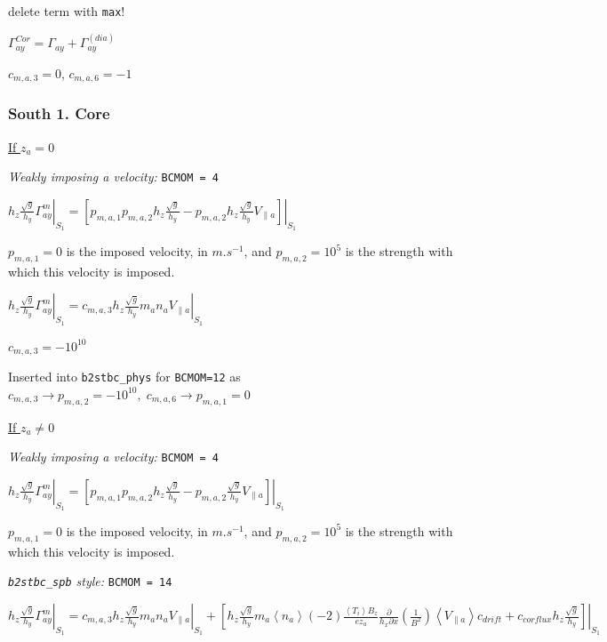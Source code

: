\documentclass[a4paper,10pt]{report}
\begin{document}
delete term with {\tt max}!

$\Gamma_{ay}^{Cor} = \Gamma_{ay} + \Gamma_{ay}^{(dia)}$

$c_{m,a,3} = 0$,  $c_{m,a,6} = -1$

\subsubsection{South 1. Core}

\underline{If $z_a = 0$}

{\em Weakly imposing a velocity:} {\tt BCMOM = 4}

$ \left. h_z \frac{\sqrt g}{h_y} \Gamma_{ay}^m \right|_{S_1} = \left. \left[
	p_{m,a,1} p_{m,a,2} h_z \frac{\sqrt g}{h_y} -
	p_{m,a,2} h_z \frac{\sqrt g}{h_y} V_{\parallel a}
\right] \right|_{S_1}$

$p_{m,a,1}=0$ is the imposed velocity, in $m.s^{-1}$, and $p_{m,a,2}=10^5$ is the strength with which this velocity is imposed.

$ \left. h_z \frac{\sqrt g}{h_y} \Gamma_{ay}^m \right|_{S_1} = c_{m,a,3} h_z \left. \frac{\sqrt g}{h_y} m_a n_a V_{\parallel a} \right|_{S_1}$

$c_{m,a,3} = -10^{10}$

Inserted into {\tt b2stbc\_phys} for {\tt BCMOM=12} as $c_{m,a,3} \rightarrow p_{m,a,2} = -10^{10},\;c_{m,a,6} \rightarrow
p_{m,a,1} = 0$

\underline{If $z_a \neq 0$}


{\em Weakly imposing a velocity:} {\tt BCMOM = 4}

$ \left. h_z \frac{\sqrt g}{h_y} \Gamma_{ay}^m \right|_{S_1} = \left. \left[
	p_{m,a,1} p_{m,a,2} h_z \frac{\sqrt g}{h_y} -
	p_{m,a,2} \frac{\sqrt g}{h_y} V_{\parallel a}
\right] \right|_{S_1}$

$p_{m,a,1}=0$ is the imposed velocity, in $m.s^{-1}$, and $p_{m,a,2}=10^5$ is the strength with which this velocity is imposed.

{\em {\tt b2stbc\_spb} style:} {\tt BCMOM = 14}

$\left. h_z \frac{\sqrt g}{h_y} \Gamma_{ay}^m \right|_{S_1} =
c_{m,a,3} h_z \left. \frac{\sqrt g}{h_y} m_a n_a V_{\parallel a} \right|_{S_1} + \left. \left[
h_z \frac{\sqrt g}{h_y} m_a \left\langle n_a \right\rangle \left( -2 \right)\frac{\left\langle T_i \right\rangle B_z}{ez_a}\frac{\partial }{h_x \partial x} \left( \frac 1{B^2} \right) \left\langle V_{\parallel a} \right\rangle c_{drift} +
c_{corflux} h_z \frac{\sqrt g}{h_y}
\right] \right|_{S_1}$
\end{document}
